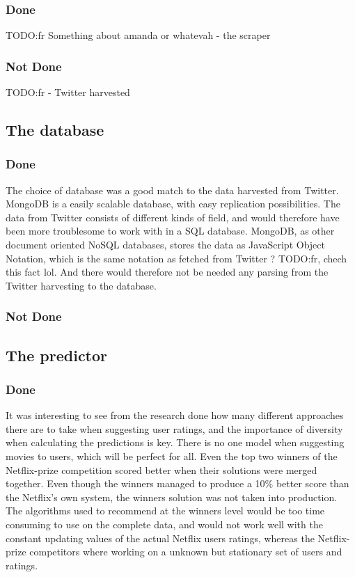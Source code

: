 \subsubsection{Done}
TODO:fr Something about amanda or whatevah - the scraper
\subsubsection{Not Done}
TODO:fr - Twitter harvested

\subsection{The database}
\subsubsection{Done}
The choice of database was a good match to the data harvested from Twitter. MongoDB is a easily scalable database, with easy replication possibilities. The data from Twitter consists of different kinds of field, and would therefore have been more troublesome to work with in a SQL database. MongoDB, as other document oriented NoSQL databases, stores the data as JavaScript Object Notation, which is the same notation as fetched from Twitter ? TODO:fr, chech this fact lol. And there would therefore not be needed any parsing from the Twitter harvesting to the database.

\subsubsection{Not Done}


\subsection{The predictor}
\subsubsection{Done}
It was interesting to see from the research done how many different approaches there are to take when suggesting user ratings, and the importance of diversity when calculating the predictions is key. There is no one model when suggesting movies to users, which will be perfect for all. Even the top two winners of the Netflix-prize competition scored better when their solutions were merged together. Even though the winners managed to produce a 10\% better score than the Netflix's own system, the winners solution was not taken into production. The algorithms used to recommend at the winners level would be too time consuming to use on the complete data, and would not work well with the constant updating values of the actual Netflix users ratings, whereas the Netflix-prize competitors where working on a unknown but stationary set of users and ratings.

